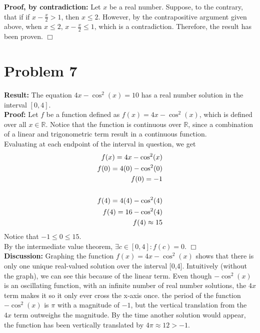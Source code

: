 \documentclass[11pt]{article}
\begin{document}
    \textbf{Proof, by contradiction:} Let $x$ be a real number. Suppose, to the contrary, that if if $ x - \frac{x}{2} > 1$, then $x \leq 2$. However, by the contrapositive argument given above, when $x \leq 2$,  $ x - \frac{x}{2} \leq 1$, which is a contradiction. Therefore, the result has been proven. \hfill $\Box$

\newpage



\section*{Problem 7}

    \textbf{Result:} The equation $4x - \cos^2(x) = 10$ has a real number solution in the interval $[0,4]$. \\
    
    \textbf{Proof:} Let $f$ be a function defined as $f(x) = 4x - \cos^2(x)$, which is defined over all $x \in \mathbb{R}$. Notice that the function is continuous over $\mathbb{R}$, since a combination of a linear and trigonometric term result in a continuous function. \\
    Evaluating at each endpoint of the interval in question, we get
    \begin{align}
        f(x) = 4x - \cos^2(x) \notag \\
        f(0) = 4(0) - \cos^2(0) \notag \\
        f(0) = -1 \notag \\
        \notag \\
        f(4) = 4(4) - \cos^2(4) \notag \\
        f(4) = 16 - \cos^2(4) \notag \\
        f(4) \approx 15 \notag
    \end{align}
    Notice that $-1 \leq 0 \leq 15$. \\
    By the intermediate value theorem, $\exists c \in [0,4]: f(c)=0$. \hfill $\Box$ \\
    
    \textbf{Discussion:} Graphing the function $f(x) = 4x - \cos^2(x)$ shows that there is only one unique real-valued solution over the interval [0,4]. Intuitively (without the graph), we can see this because of the linear term. Even though $-\cos^2(x)$ is an oscillating function, with an infinite number of real number solutions, the $4x$ term makes it so it only ever cross the x-axis once. the period of the function $-\cos^2(x)$ is $\pi$ with a magnitude of $-1$, but the vertical translation from the $4x$ term outweighs the magnitude. By the time another solution would appear, the function has been vertically translated by $4\pi \approx 12 > -1$.
\newpage
\end{document}
